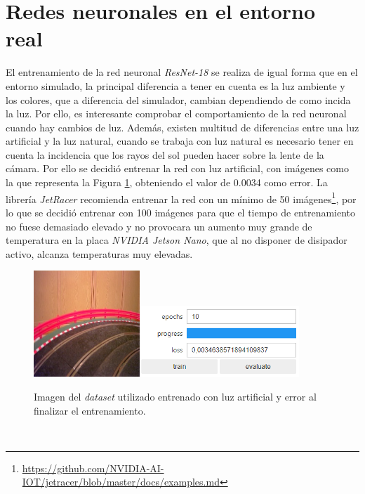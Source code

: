 \section{Redes neuronales en el entorno real}
El entrenamiento de la red neuronal \textit{ResNet-18} se realiza de igual forma que en el entorno simulado, la principal diferencia a tener en cuenta es la luz ambiente y los colores, que a diferencia del simulador, cambian dependiendo de como incida la luz. Por ello, es interesante comprobar el comportamiento de la red neuronal cuando hay cambios de luz. Además, existen multitud de diferencias entre una luz artificial y la luz natural, cuando se trabaja con luz natural es necesario tener en cuenta la incidencia que los rayos del sol pueden hacer sobre la lente de la cámara. Por ello se decidió entrenar la red con luz artificial, con imágenes como la que representa la Figura \ref{fig:imagedataset}, obteniendo el valor de 0.0034 como error. La librería \textit{JetRacer} recomienda entrenar la red con un mínimo de 50 imágenes\footnote{\url{https://github.com/NVIDIA-AI-IOT/jetracer/blob/master/docs/examples.md}}, por lo que se decidió entrenar con 100 imágenes para que el tiempo de entrenamiento no fuese demasiado elevado y no provocara un aumento muy grande de temperatura en la placa \textit{NVIDIA Jetson Nano}, que al no disponer de disipador activo, alcanza temperaturas muy elevadas.\\

\begin{figure} [h!]
	\begin{center}
		\includegraphics[width=4cm]{figs/imagedataset}\hspace{1cm}\includegraphics[width=6cm]{figs/epoch}
	\end{center}
	\caption{Imagen del \textit{dataset} utilizado entrenado con luz artificial y error al finalizar el entrenamiento.}
	\label{fig:imagedataset}
\end{figure}\

